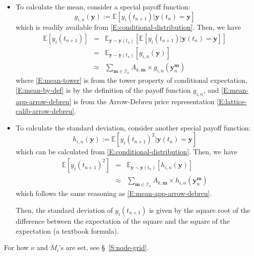 \documentclass{texyise}
\newcommand{\indexset}{\mathcal{I}}
\begin{document}
\begin{itemize}
    \item To calculate the mean, consider a special payoff function:
    \begin{equation}
    g_{i,n}(\bm{y}) := \mathbb{E}[y_i(t_{n+1}) | \bm{y}(t_n) = \bm{y}]
    \end{equation}
    which is readily available from \eqref{E:conditional-distribution}.
    Then, we have
    \begin{eqnarray}
        \mathbb{E}[y_i(t_{n+1})] & = & \mathbb{E}_{\bm{y}\sim\bm{y}(t_n)}[\mathbb{E}[y_i(t_{n+1}) | \bm{y}(t_n) = \bm{y}]] \label{E:mean-tower}\\
                  & = & \mathbb{E}_{\bm{y}\sim\bm{y}(t_n)}[g_{i,n}(\bm{y})] \label{E:mean-by-def}\\
                  & \approx & \sum_{\bm{m} \in \indexset_n} A_{k, \bm{m}} \times g_{i,n}(\bm{y}_{n}^{\bm{m}}) \label{E:mean-app-arrow-debreu} 
    \end{eqnarray}
    where \eqref{E:mean-tower} is from the tower property of conditional expectation, \eqref{E:mean-by-def} is by the definition of the payoff function $g_{i,n}$, and \eqref{E:mean-app-arrow-debreu} is from the Arrow-Debreu price representation \eqref{E:lattice-calib-arrow-debreu}.
    \item To calculate the standard deviation, consider another special payoff function:
    \begin{equation}
        h_{i,n}(\bm{y}) := \mathbb{E}[y_i(t_{n+1})^2|\bm{y}(t_n)= \bm{y}] 
    \end{equation}
    which can be calculated from \eqref{E:conditional-distribution}. Then, we have
    \begin{eqnarray}
        \mathbb{E}[y_i(t_{n+1})^2] & = & \mathbb{E}_{\bm{y}\sim\bm{y}(t_n)}[h_{i,n}(\bm{y})] \label{E:variance-by-def}\\
                  & \approx & \sum_{\bm{m} \in \indexset_n} A_{k, \bm{m}} \times h_{i,n}(\bm{y}_{n}^{\bm{m}}) \label{E:variance-app-arrow-debreu}
    \end{eqnarray} 
    which follows the same reasoning as \eqref{E:mean-app-arrow-debreu}.

    Then, the standard deviation of $y_i(t_{n+1})$ is given by the square root of the difference between the expectation of the square and the square of the expectation (a textbook formula). 
\end{itemize}

For how $\nu$ and $M_i$'s are set, see \S~\ref{S:node-grid}.
\end{document}
